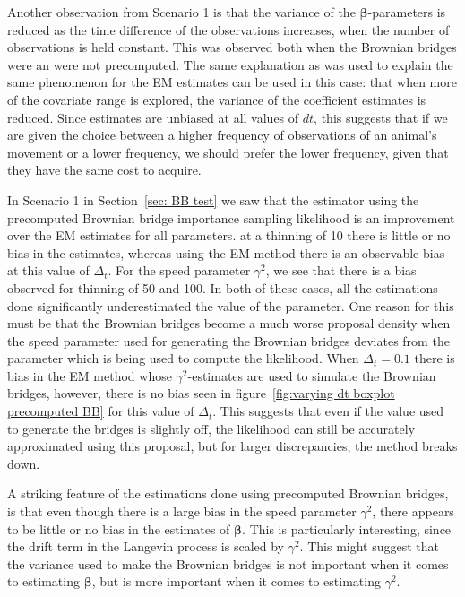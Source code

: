 Another observation from Scenario 1 is that the variance of the $\bm \beta$-parameters is reduced as the time difference of the observations increases, when the number of observations is held constant. This was observed both when the Brownian bridges were an were not precomputed. The same explanation as was used to explain the same phenomenon for the EM estimates can be used in this case: that when more of the covariate range is explored, the variance of the coefficient estimates is reduced. Since estimates are unbiased at all values of $dt$, this suggests that if we are given the choice between a higher frequency of observations of an animal's movement or a lower frequency, we should prefer the lower frequency, given that they have the same cost to acquire.


In Scenario 1 in Section~\ref{sec: BB test} we saw that the estimator using the precomputed Brownian bridge importance sampling likelihood is an improvement over the EM estimates for all parameters. at a thinning of 10 there is little or no bias in the estimates, whereas using the EM method there is an observable bias at this value of $\Delta_t$. For the speed parameter $\gamma^2$, we see that there is a bias observed for thinning of 50 and 100. In both of these cases, all the estimations done significantly underestimated the value of the parameter. One reason for this must be that the Brownian bridges become a much worse proposal density when the speed parameter used for generating the Brownian bridges deviates from the parameter which is being used to compute the likelihood. 
When $\Delta_t=0.1$ there is bias in the EM method whose $\gamma^2$-estimates are used to simulate the Brownian bridges, however, there is no bias seen in figure~\ref{fig:varying dt boxplot precomputed BB} for this value of $\Delta_t$. This suggests that even if the value used to generate the bridges is slightly off, the likelihood can still be accurately approximated using this proposal, but for larger discrepancies, the method breaks down. 



A striking feature of the estimations done using precomputed Brownian bridges, is that even though there is a large bias in the speed parameter $\gamma^2$, there appears to be little or no bias in the estimates of $\bm \beta$. This is particularly interesting, since the drift term in the Langevin process is scaled by $\gamma^2$. This might suggest that the variance used to make the Brownian bridges is not important when it comes to estimating $\bm \beta$, but is more important when it comes to estimating $\gamma^2$. 




